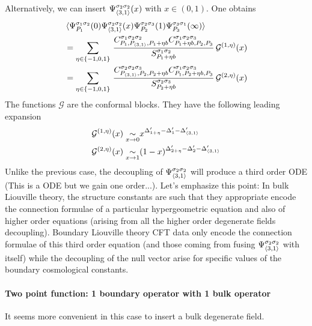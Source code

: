\documentclass[a4paper]{article}
\begin{document}
Alternatively, we can insert $\Psi^{\sigma_2 \sigma_2}_{\braket{3,1}}(x)$ with $x\in(0,1)$. One obtains
\begin{equation}
\begin{aligned}
    &\braket{\Psi_{P_1}^{\sigma_1 \sigma_2}(0)\Psi^{\sigma_2\sigma_2}_{\braket{3,1}}(x)\Psi_{P_2}^{\sigma_2 \sigma_3}(1)\Psi_{P_3}^{\sigma_3 \sigma_1}(\infty)}\\
    &=\sum_{\eta\in\{-1,0,1\}}\,\frac{C_{P_1,P_{\braket{3,1}},P_1+\eta b}^{\sigma_1 \sigma_2 \sigma_2}C_{P_1+\eta b,P_2,P_3}^{\sigma_1 \sigma_2 \sigma_3 }}{S_{P_1+\eta b}^{\sigma_1 \sigma_2}}\,\mathcal{G}^{(1,\eta)}(x)\\
    &=\sum_{\eta\in\{-1,0,1\}}\,\frac{C_{P_{\braket{3,1}},P_2,P_2+\eta b}^{\sigma_2 \sigma_2 \sigma_3}C_{P_1,P_2+\eta b,P_3}^{\sigma_1 \sigma_2 \sigma_3 }}{S_{P_2+ \eta b }^{\sigma_2 \sigma_3}}\,\mathcal{G}^{(2,\eta)}(x)
\end{aligned}
\end{equation}
The functions $\mathcal{G}$ are the conformal blocks. They have the following leading expansion
\begin{equation}
\begin{aligned}
  \mathcal{G}^{(1,\eta)}(x)\underset{x\to0}{\sim} &x^{\Delta'_{1+\eta}-\Delta'_{1}-\Delta'_{\braket{3,1}}}\\
  \mathcal{G}^{(2,\eta)}(x)\underset{x\to1}{\sim} &(1-x)^{\Delta'_{2+\eta}-\Delta'_{2}-\Delta'_{\braket{3,1}}}
\end{aligned}
\end{equation}
Unlike the previous case, the decoupling of $\Psi^{\sigma_2\sigma_2}_{\braket{3,1}}$ will produce a third order ODE (This is a ODE but we gain one order...). Let's emphasize this point: In bulk Liouville theory, the structure constants are such that they appropriate encode the connection formulae of a particular hypergeometric equation and also of higher order equations (arising from all the higher order degenerate fields decoupling). Boundary Liouville theory CFT data only encode the connection formulae of this third order equation (and those coming from fusing $\Psi^{\sigma_2\sigma_2}_{\braket{3,1}}$ with itself) while the decoupling of the null vector arise for specific values of the boundary cosmological constants. 

\paragraph{Two point function: 1 boundary operator with 1 bulk operator} It seems more convenient in this case to insert a bulk degenerate field.
\end{document}
